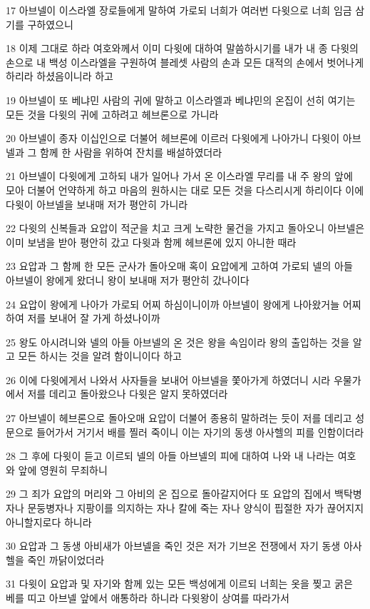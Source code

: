 \par 17 아브넬이 이스라엘 장로들에게 말하여 가로되 너희가 여러번 다윗으로 너희 임금 삼기를 구하였으니
\par 18 이제 그대로 하라 여호와께서 이미 다윗에 대하여 말씀하시기를 내가 내 종 다윗의 손으로 내 백성 이스라엘을 구원하여 블레셋 사람의 손과 모든 대적의 손에서 벗어나게 하리라 하셨음이니라 하고
\par 19 아브넬이 또 베냐민 사람의 귀에 말하고 이스라엘과 베냐민의 온집이 선히 여기는 모든 것을 다윗의 귀에 고하려고 헤브론으로 가니라
\par 20 아브넬이 종자 이십인으로 더불어 헤브론에 이르러 다윗에게 나아가니 다윗이 아브넬과 그 함께 한 사람을 위하여 잔치를 배설하였더라
\par 21 아브넬이 다윗에게 고하되 내가 일어나 가서 온 이스라엘 무리를 내 주 왕의 앞에 모아 더불어 언약하게 하고 마음의 원하시는 대로 모든 것을 다스리시게 하리이다 이에 다윗이 아브넬을 보내매 저가 평안히 가니라
\par 22 다윗의 신복들과 요압이 적군을 치고 크게 노략한 물건을 가지고 돌아오니 아브넬은 이미 보냄을 받아 평안히 갔고 다윗과 함께 헤브론에 있지 아니한 때라
\par 23 요압과 그 함께 한 모든 군사가 돌아오매 혹이 요압에게 고하여 가로되 넬의 아들 아브넬이 왕에게 왔더니 왕이 보내매 저가 평안히 갔나이다
\par 24 요압이 왕에게 나아가 가로되 어찌 하심이니이까 아브넬이 왕에게 나아왔거늘 어찌하여 저를 보내어 잘 가게 하셨나이까
\par 25 왕도 아시려니와 넬의 아들 아브넬의 온 것은 왕을 속임이라 왕의 출입하는 것을 알고 모든 하시는 것을 알려 함이니이다 하고
\par 26 이에 다윗에게서 나와서 사자들을 보내어 아브넬을 쫓아가게 하였더니 시라 우물가에서 저를 데리고 돌아왔으나 다윗은 알지 못하였더라
\par 27 아브넬이 헤브론으로 돌아오매 요압이 더불어 종용히 말하려는 듯이 저를 데리고 성문으로 들어가서 거기서 배를 찔러 죽이니 이는 자기의 동생 아사헬의 피를 인함이더라
\par 28 그 후에 다윗이 듣고 이르되 넬의 아들 아브넬의 피에 대하여 나와 내 나라는 여호와 앞에 영원히 무죄하니
\par 29 그 죄가 요압의 머리와 그 아비의 온 집으로 돌아갈지어다 또 요압의 집에서 백탁병자나 문둥병자나 지팡이를 의지하는 자나 칼에 죽는 자나 양식이 핍절한 자가 끊어지지 아니할지로다 하니라
\par 30 요압과 그 동생 아비새가 아브넬을 죽인 것은 저가 기브온 전쟁에서 자기 동생 아사헬을 죽인 까닭이었더라
\par 31 다윗이 요압과 및 자기와 함께 있는 모든 백성에게 이르되 너희는 옷을 찢고 굵은 베를 띠고 아브넬 앞에서 애통하라 하니라 다윗왕이 상여를 따라가서
